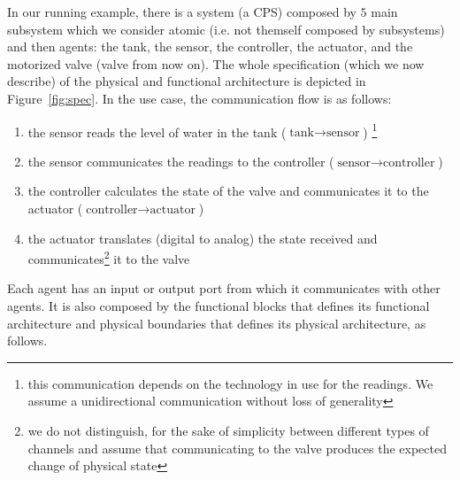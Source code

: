 In our running example, there is a system (a CPS) composed by $5$ main
subsystem which we consider atomic (i.e. not themself composed by subsystems)
and then agents: the tank, the sensor, the controller, the actuator, and the
motorized valve (valve from now on).  The whole specification (which we now
describe) of the physical and functional architecture is depicted in
Figure~\ref{fig:spec}.  In the use case, the communication flow is as follows:
\begin{enumerate}
	\item the sensor reads the level of water in the tank ($\text{tank}\rightarrow \text{sensor}$) \footnote{this communication depends on the technology in use for the readings. We assume a unidirectional communication without loss of generality}
	\item the sensor communicates the readings to the controller ($\text{sensor}\rightarrow \text{controller}$)
	\item the controller calculates the state of the valve and communicates it to the actuator ($\text{controller}\rightarrow \text{actuator}$)
	\item the actuator translates (digital to analog) the state received and communicates\footnote{we do not distinguish, for the sake of simplicity between different types of channels and assume that communicating to the valve produces the expected change of physical state} it to the valve
\end{enumerate}
Each agent has an input or output port from which it communicates with other
agents.  It is also composed by the functional blocks that defines its
functional architecture and physical boundaries that defines its physical
architecture, as follows.
